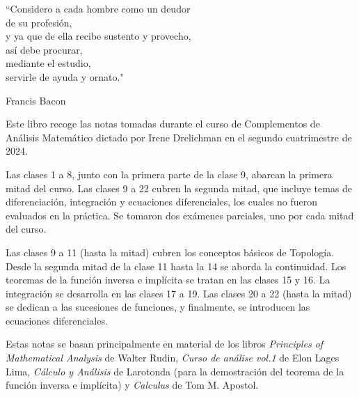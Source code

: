 \epigraph{``Considero a cada hombre como un deudor \\ de su profesión, \\ y ya que de ella recibe sustento y provecho, \\ así debe procurar, \\ mediante el estudio, \\ servirle de ayuda y ornato."}{Francis Bacon}

Este libro recoge las notas tomadas durante el curso de Complementos de Análisis Matemático dictado por Irene Drelichman en el segundo cuatrimestre de 2024.

Las clases 1 a 8, junto con la primera parte de la clase 9, abarcan la primera mitad del curso. Las clases 9 a 22 cubren la segunda mitad, que incluye temas de diferenciación, integración y ecuaciones diferenciales, los cuales no fueron evaluados en la práctica. Se tomaron dos exámenes parciales, uno por cada mitad del curso.

Las clases 9 a 11 (hasta la mitad) cubren los conceptos básicos de Topología. Desde la segunda mitad de la clase 11 hasta la 14 se aborda la continuidad. Los teoremas de la función inversa e implícita se tratan en las clases 15 y 16. La integración se desarrolla en las clases 17 a 19. Las clases 20 a 22 (hasta la mitad) se dedican a las sucesiones de funciones, y finalmente, se introducen las ecuaciones diferenciales.

Estas notas se basan principalmente en material de los libros \textit{Principles of Mathematical Analysis} de Walter Rudin, \textit{Curso de análise vol.1} de Elon Lages Lima, \textit{Cálculo y Análisis} de Larotonda (para la demostración del teorema de la función inversa e implícita) y \textit{Calculus} de Tom M. Apostol.
